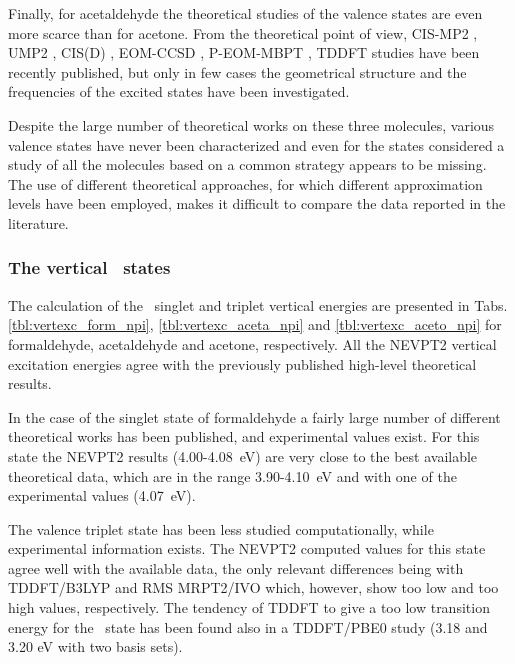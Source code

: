 Finally, for acetaldehyde the theoretical studies of the valence states are
even more scarce than for acetone.  From the theoretical point of view,
CIS-MP2 \cite{jpc-97-4293-1993}, UMP2  \cite{jpc-98-1519-1994,jms_theo-315-9-1994}, CIS(D) \cite{cpl-219-21-1994},
EOM-CCSD \cite{cpl-241-26-1995}, P-EOM-MBPT \cite{cpl-248-189-1996}, TDDFT
\cite{jcp-108-4060-1998,cpl-297-60-1998} studies have been recently published, but only in
few cases the geometrical structure and the frequencies of the excited
states have been investigated.  

Despite the large number of theoretical works on these three molecules,
various valence states have never been characterized and even for the states
considered a study of all the molecules based on a common strategy appears
to be missing. The use of different theoretical approaches, for which
different approximation levels have been employed, makes it difficult to 
compare the data reported in the literature.

\subsubsection*{The vertical \npi\  states}
The calculation of the \npi\  singlet and triplet vertical 
energies are presented in Tabs. \ref{tbl:vertexc_form_npi},
\ref{tbl:vertexc_aceta_npi} and \ref{tbl:vertexc_aceto_npi} for
formaldehyde, acetaldehyde and acetone, respectively.  All the NEVPT2
vertical excitation energies agree with the previously published high-level
theoretical results. 

In the case of the singlet state of formaldehyde a fairly large number of
different theoretical works has been published, and experimental values
exist. For this state the NEVPT2 results (4.00-4.08~eV) are very close to
the best available theoretical data, which are in the range 3.90-4.10~eV and
with one of the experimental values (4.07~eV).

The valence triplet state has been less studied computationally, while
experimental information exists.  The NEVPT2 computed values for this state
agree well with the available data, the only relevant differences being with
TDDFT/B3LYP\cite{cpl-297-60-1998} and RMS MRPT2/IVO\cite{cpl-296-435-1998}
which, however, show too low and too high values, respectively.
The tendency of TDDFT to give a too low transition energy for the \tnpi\
state has been found also in a TDDFT/PBE0 study\cite{jcp-111-2889-1999}
(3.18 and 3.20 eV with two basis sets).

